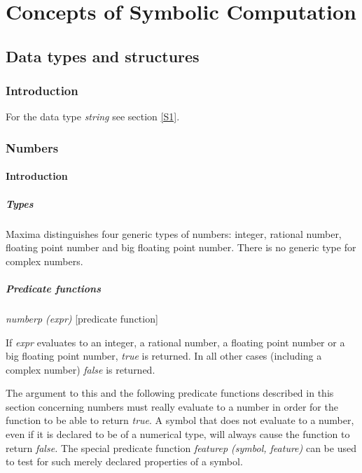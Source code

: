\documentclass[../Maxima_Workbook.tex]{subfiles}
\begin{document}
\part{Concepts of Symbolic Computation}

\chapter{Data types and structures}

\section{Introduction}

For the data type \emph{string} see section \ref{S1}.

\section{Numbers}

\subsection{Introduction}

\subsubsection{Types}\label{DS3}

Maxima distinguishes four generic types of numbers: integer, rational number, floating point number and big floating point number. There is no generic type for complex numbers.

\subsubsection{Predicate functions}

\emph{numberp (expr)} \hfill [predicate function]

\lz If \emph{expr} evaluates to an integer, a rational number, a floating point number or a big floating point number, \emph{true} is returned. In all other cases (including a complex number) \emph{false} is returned.

\lz \begin{remark}
	The argument to this and the following predicate functions described in this section concerning numbers must really evaluate to a number in order for the function to be able to return \emph{true}. A symbol that does not evaluate to a number, even if it is declared to be of a numerical type, will always cause the function to return \emph{false.} The special predicate function \emph{featurep (symbol, feature)} can be used to test for such merely declared properties of a symbol.
\end{remark}
\end{document}
